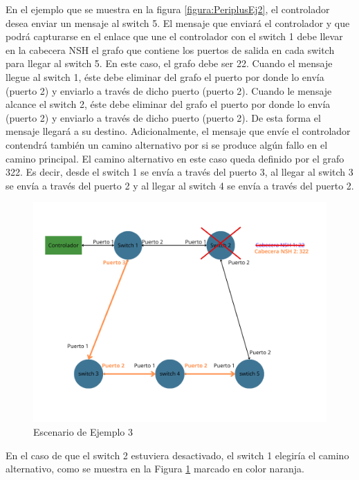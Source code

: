 \documentclass[a4paper, 12pt]{book}
\begin{document}
	En el ejemplo que se muestra en la figura \ref{figura:PeriplusEj2}, el controlador desea enviar un mensaje
	al switch 5. El mensaje que enviará el controlador y que podrá capturarse en el enlace que une el
	controlador con el switch 1 debe llevar en la cabecera NSH el grafo que contiene
	los puertos de salida en cada switch para llegar al switch 5. En este caso,
	el grafo debe ser 22. Cuando el mensaje llegue al switch 1, éste debe eliminar del
	grafo el puerto por donde lo envía (puerto 2) y
	enviarlo a través de dicho puerto (puerto 2). Cuando le mensaje alcance el
	switch 2, éste debe eliminar del grafo el puerto por donde lo envía (puerto 2) y enviarlo
	a través de dicho puerto (puerto 2). De esta forma el mensaje llegará a
	su destino.
	Adicionalmente, el mensaje que envíe el controlador contendrá también un camino alternativo
	por si se produce algún fallo en el camino principal. El camino alternativo en este caso queda
	definido por el grafo 322. Es decir, desde el switch 1 se envía a través del puerto 3, al llegar al
	switch 3 se envía a través del puerto 2 y al llegar al switch 4 se envía a través del puerto 2.


	\begin{figure}[H]
		\centering
		\includegraphics[width=16cm, keepaspectratio]{img/Ejemplo Periplus 3}
		\caption{Escenario de Ejemplo 3}
		\label{figura:PeriplusEj3}
	\end{figure}
	
	En el caso de que el switch 2 estuviera desactivado, el switch 1 elegiría el camino alternativo, como se muestra en la Figura \ref{figura:PeriplusEj3} marcado en color naranja.
	
\end{document}
